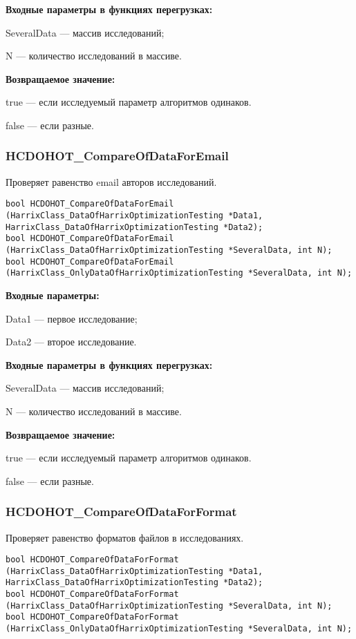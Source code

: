 \documentclass[a4paper,12pt]{article}
\begin{document}
\textbf{Входные параметры в функциях перегрузках:}

SeveralData --- массив исследований;

N --- количество исследований в массиве.

\textbf{Возвращаемое значение:}

true --- если исследуемый параметр алгоритмов одинаков.

false --- если разные.


\subsubsection{HCDOHOT\_CompareOfDataForEmail}\label{HCDOHOT_CompareOfDataForEmail}

Проверяет равенство email авторов исследований.


\begin{lstlisting}[label=code_syntax_HCDOHOT_CompareOfDataForEmail,caption=Синтаксис]
bool HCDOHOT_CompareOfDataForEmail (HarrixClass_DataOfHarrixOptimizationTesting *Data1, HarrixClass_DataOfHarrixOptimizationTesting *Data2);
bool HCDOHOT_CompareOfDataForEmail (HarrixClass_DataOfHarrixOptimizationTesting *SeveralData, int N);
bool HCDOHOT_CompareOfDataForEmail (HarrixClass_OnlyDataOfHarrixOptimizationTesting *SeveralData, int N);
\end{lstlisting}

\textbf{Входные параметры:}

Data1 --- первое исследование;

Data2 --- второе исследование.

\textbf{Входные параметры в функциях перегрузках:}

SeveralData --- массив исследований;

N --- количество исследований в массиве.

\textbf{Возвращаемое значение:}

true --- если исследуемый параметр алгоритмов одинаков.

false --- если разные.


\subsubsection{HCDOHOT\_CompareOfDataForFormat}\label{HCDOHOT_CompareOfDataForFormat}

Проверяет равенство форматов файлов в исследованиях.


\begin{lstlisting}[label=code_syntax_HCDOHOT_CompareOfDataForFormat,caption=Синтаксис]
bool HCDOHOT_CompareOfDataForFormat (HarrixClass_DataOfHarrixOptimizationTesting *Data1, HarrixClass_DataOfHarrixOptimizationTesting *Data2);
bool HCDOHOT_CompareOfDataForFormat (HarrixClass_DataOfHarrixOptimizationTesting *SeveralData, int N);
bool HCDOHOT_CompareOfDataForFormat (HarrixClass_OnlyDataOfHarrixOptimizationTesting *SeveralData, int N);
\end{lstlisting}
\end{document}
